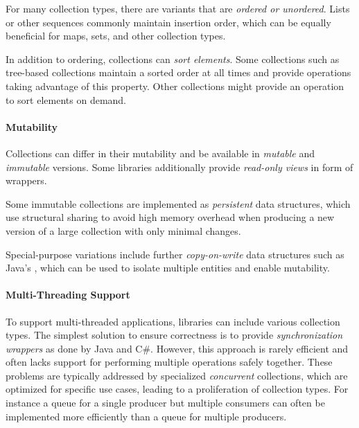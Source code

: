 \documentclass[sigconf, authorversion]{acmart}
\begin{document}
For many collection types,
there are variants that are \emph{ordered or unordered}.
Lists or other sequences commonly maintain insertion order,
which can be equally beneficial for maps, sets, and other collection types.

In addition to ordering, collections can \emph{sort elements}.
Some collections such as tree-based collections maintain a sorted order at all times and
provide operations taking advantage of this property.
Other collections might provide an operation to sort elements on demand.

\paragraph{Mutability}


Collections can differ in their mutability
and be available in \emph{mutable} and \emph{immutable} versions.
Some libraries additionally provide \emph{read-only views} in form of wrappers.

Some immutable collections are implemented as \emph{persistent} data structures,
which use structural sharing to avoid high memory overhead when producing
a new version of a large collection with only minimal changes.

Special-purpose variations include further
\emph{copy-on-write} data structures
such as Java's ,
which can be used to isolate multiple entities
and enable mutability.


\paragraph{Multi-Threading Support}


To support multi-threaded applications, 
libraries can include various collection types.
The simplest solution to ensure correctness is
to provide \emph{synchronization wrappers} as done by Java and C\#.
However, this approach is rarely efficient
and often lacks support for performing multiple operations safely together.
These problems are typically addressed
by specialized \emph{concurrent} collections,
which are optimized for specific use cases,
leading to a proliferation of collection types.
For instance a queue for a single producer but multiple consumers
can often be implemented
more efficiently than a queue for multiple producers.
\end{document}
